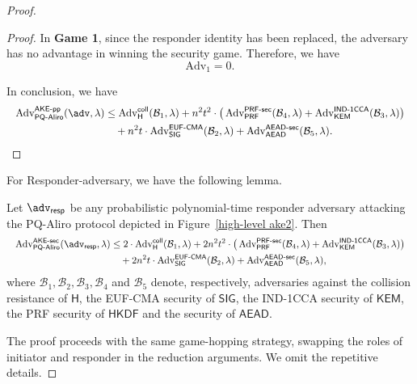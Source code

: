 \documentclass[runningheads]{llncs}
\newcommand{\kem}{\mathsf{KEM}}
\newcommand{\hkdf}{\mathsf{HKDF}}
\begin{document}
\begin{proof}
\begin{proof}
    In \textbf{Game 1}, since the responder identity has been replaced, the adversary has no advantage in winning the security game.
    Therefore, we have
    $$
    \mathrm{Adv}_{1} = 0.
    $$

    In conclusion, we have
    \begin{equation*}
\resizebox{\linewidth}{!}{$\displaystyle
\begin{aligned}
\textrm{Adv}_{\mathsf{PQ}\text{-}\mathsf{Aliro}}^{\mathsf{AKE}\text{-}\mathsf{pp}}(\adv,\lambda)
&\leq \operatorname{Adv}_{\mathsf{H}}^{\mathsf{coll}}(\mathcal{B}_{1}, \lambda)
+ n^{2} t^{2}
\cdot \big( \operatorname{Adv}_{\mathsf{PRF}}^{\mathsf{PRF}\text{-}\mathsf{sec}}(\mathcal{B}_{4}, \lambda)
+ \operatorname{Adv}_{\kem}^{\mathsf{IND}\text{-}\mathsf{1CCA}}(\mathcal{B}_{3},\lambda)\big) \\
&\quad + n^{2} t \cdot \operatorname{Adv}_{\mathsf{SIG}}^{\mathsf{EUF}\text{-}\mathsf{CMA}}(\mathcal{B}_{2}, \lambda) + \mathrm{Adv}_{\mathsf{AEAD}}^{\mathsf{AEAD}\text{-}\mathsf{sec}}(\mathcal{B}_{5},\lambda).
\end{aligned}$}
\end{equation*}
\end{proof}

For \textsf{Responder}-adversary, we have the following lemma.

\begin{lemma}
    \label{initiator lemma}
    Let $\adv_{\sf resp}$ be any probabilistic polynomial-time responder adversary attacking the PQ-Aliro protocol depicted in Figure~\ref{high-level ake2}. Then
    \begin{equation*}
\resizebox{\linewidth}{!}{$\displaystyle
\begin{aligned}
\operatorname{Adv}_{\mathsf{PQ}\text{-}\mathsf{Aliro}}^{\mathsf{AKE}\text{-}\mathsf{sec}}(\adv_{\mathsf{resp}}, \lambda)
    &\leq 2\cdot \operatorname{Adv}_{\mathsf{H}}^{\mathsf{coll}}(\mathcal{B}_{1}, \lambda)
    + 2n^{2} t^{2}
    \cdot \big( \operatorname{Adv}_{\mathsf{PRF}}^{\mathsf{PRF}\text{-}\mathsf{sec}}(\mathcal{B}_{4}, \lambda)
    + \operatorname{Adv}_{\kem}^{\mathsf{IND}\text{-}\mathsf{1CCA}}(\mathcal{B}_{3},\lambda)\big) \\
    &\quad + 2n^{2} t \cdot \operatorname{Adv}_{\mathsf{SIG}}^{\mathsf{EUF}\text{-}\mathsf{CMA}}(\mathcal{B}_{2}, \lambda) + \mathrm{Adv}_{\mathsf{AEAD}}^{\mathsf{AEAD}\text{-}\mathsf{sec}}(\mathcal{B}_{5},\lambda),
\end{aligned}$}
\end{equation*}
where  $\mathcal{B}_{1}, \mathcal{B}_{2}, \mathcal{B}_{3}, \mathcal{B}_{4}$ and $\mathcal{B}_{5}$ denote, respectively, adversaries against the collision resistance of $\mathsf{H}$, the EUF-CMA security of $\mathsf{SIG}$, the IND-1CCA security of $\kem$, the PRF security of $\hkdf$ and the security of $\mathsf{AEAD}$.
    \end{lemma}

The proof proceeds with the same game-hopping strategy, swapping the roles of initiator and responder in the reduction arguments. We omit the repetitive details.

\end{proof}
\end{document}
